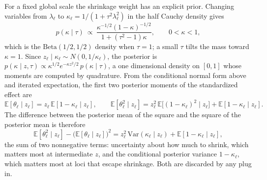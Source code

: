 For a fixed global scale the shrinkage weight has an explicit prior. Changing variables from $\lambda_\ell$ to $\kappa_\ell = 1/(1+\tau^2\lambda_\ell^2)$ in the half Cauchy density gives
\begin{equation}
p(\kappa\mid\tau) \ \propto\ \frac{\kappa^{-1/2}(1-\kappa)^{-1/2}}{1 + (\tau^2-1)\kappa}, \qquad 0<\kappa<1,
\label{hs:eq:kappaprior}
\end{equation}
which is the $\mathrm{Beta}(1/2,1/2)$ density when $\tau = 1$; a small $\tau$ tilts the mass toward $\kappa = 1$. Since $z_\ell \mid \kappa_\ell \sim N(0, 1/\kappa_\ell)$, the posterior is $p(\kappa\mid z,\tau) \propto \kappa^{1/2}e^{-\kappa z^2/2}\,p(\kappa\mid\tau)$, a one dimensional density on $[0,1]$ whose moments are computed by quadrature. From the conditional normal form above and iterated expectation, the first two posterior moments of the standardized effect are
\begin{equation}
\mathbb{E}[\theta_\ell\mid z_\ell] = z_\ell\,\mathbb{E}[1-\kappa_\ell\mid z_\ell],
\qquad
\mathbb{E}[\theta^2_\ell\mid z_\ell] = z_\ell^2\,\mathbb{E}\big[(1-\kappa_\ell)^2\mid z_\ell\big] + \mathbb{E}[1-\kappa_\ell\mid z_\ell].
\label{hs:eq:moments}
\end{equation}
The difference between the posterior mean of the square and the square of the posterior mean is therefore
\begin{equation}
\mathbb{E}[\theta^2_\ell\mid z_\ell] - \big(\mathbb{E}[\theta_\ell\mid z_\ell]\big)^2 = z_\ell^2\,\mathrm{Var}(\kappa_\ell\mid z_\ell) + \mathbb{E}[1-\kappa_\ell\mid z_\ell],
\label{hs:eq:gap}
\end{equation}
the sum of two nonnegative terms: uncertainty about how much to shrink, which matters most at intermediate $z$, and the conditional posterior variance $1-\kappa_\ell$, which matters most at loci that escape shrinkage. Both are discarded by any plug in.

